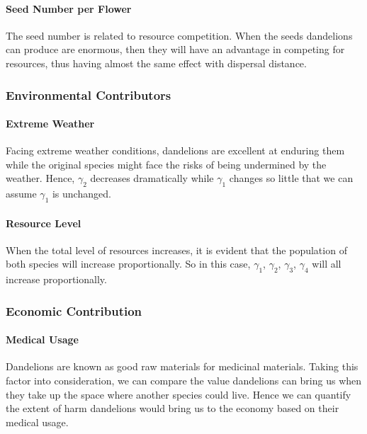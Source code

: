 \documentclass[12pt]{article}
\begin{document}
\paragraph{Seed Number per Flower}
The seed number is related to resource competition. When the seeds dandelions can produce are enormous, then they will have an advantage in competing for resources, thus having almost the same effect with dispersal distance.

\subsubsection{Environmental Contributors}
\paragraph{Extreme Weather}
Facing extreme weather conditions, dandelions are excellent at enduring them while the original species might face the risks of being undermined by the weather. Hence, $\gamma_2$ decreases dramatically while $\gamma_1$ changes so little that we can assume $\gamma_1$ is unchanged.

\paragraph{Resource Level}
When the total level of resources increases, it is evident that the population of both species will increase proportionally. So in this case, $\gamma_1$, $\gamma_2$, $\gamma_3$, $\gamma_4$ will all increase proportionally.

\subsubsection{Economic Contribution}
\paragraph{Medical Usage}
Dandelions are known as good raw materials for medicinal materials. Taking this factor into consideration, we can compare the value dandelions can bring us when they take up the space where another species could live. Hence we can quantify the extent of harm dandelions would bring us to the economy based on their medical usage.%
\end{document}
